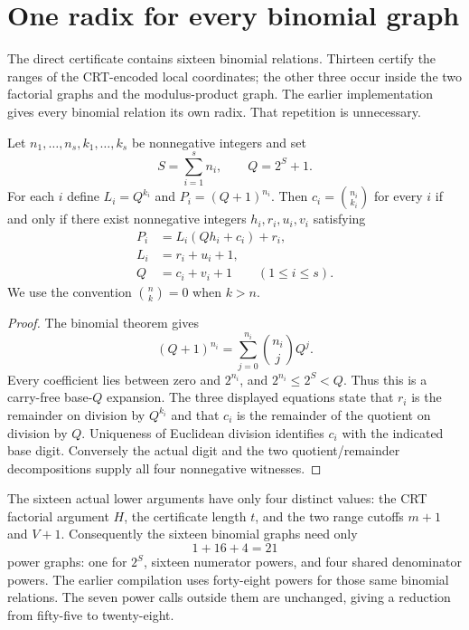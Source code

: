 \section{One radix for every binomial graph}
\label{sec:common-radix}

The direct certificate contains sixteen binomial relations. Thirteen
certify the ranges of the CRT-encoded local coordinates; the other three
occur inside the two factorial graphs and the modulus-product graph.
The earlier implementation gives every binomial relation its own radix.
That repetition is unnecessary.

\begin{theorem}
Let $n_1,\ldots,n_s,k_1,\ldots,k_s$ be nonnegative integers and set
\[
 S=\sum_{i=1}^s n_i,\qquad Q=2^S+1.
\]
For each $i$ define $L_i=Q^{k_i}$ and $P_i=(Q+1)^{n_i}$.
Then $c_i=\binom{n_i}{k_i}$ for every $i$ if and only if there exist
nonnegative integers $h_i,r_i,u_i,v_i$ satisfying
\begin{align*}
 P_i&=L_i(Qh_i+c_i)+r_i,\\
 L_i&=r_i+u_i+1,\\
 Q&=c_i+v_i+1
 \qquad(1\le i\le s).
\end{align*}
We use the convention $\binom nk=0$ when $k>n$.
\end{theorem}

\begin{proof}
The binomial theorem gives
\[
 (Q+1)^{n_i}=\sum_{j=0}^{n_i}\binom{n_i}{j}Q^j.
\]
Every coefficient lies between zero and $2^{n_i}$, and
$2^{n_i}\le 2^S<Q$. Thus this is a carry-free base-$Q$ expansion.
The three displayed equations state that $r_i$ is the remainder on
division by $Q^{k_i}$ and that $c_i$ is the remainder of the quotient
on division by $Q$. Uniqueness of Euclidean division identifies $c_i$
with the indicated base digit. Conversely the actual digit and the
two quotient/remainder decompositions supply all four nonnegative
witnesses.
\end{proof}

The sixteen actual lower arguments have only four distinct values:
the CRT factorial argument $H$, the certificate length $t$, and the
two range cutoffs $m+1$ and $V+1$. Consequently the sixteen binomial
graphs need only
\[
 1+16+4=21
\]
power graphs: one for $2^S$, sixteen numerator powers, and four shared
denominator powers. The earlier compilation uses forty-eight powers
for those same binomial relations. The seven power calls outside them
are unchanged, giving a reduction from fifty-five to twenty-eight.


